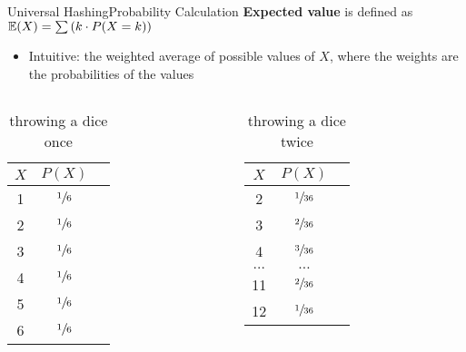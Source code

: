 \begin{frame}{Universal Hashing}{Probability Calculation}
  \textbf{Expected value} is defined as  {\color{MainA}$\mathbb{E}(X)  = \sum \left(k \cdot P(X = k)\right)$}
  \vspace*{0em}
  \begin{itemize}
    \item <2->
      Intuitive: the weighted average of possible values of {\color{MainA}$X$}, where
      the weights are the probabilities of the values
  \end{itemize}
  \vspace*{-1.0em}
 \begin{columns}
   \begin{column}{0.5\linewidth}
     \begin{table}[!h]
       \small{
     \caption{throwing a dice once}
    \label{tab:probabilities:value_rolling_dice_once}
    \begin{tabularx}{0.25\linewidth}{c|cc}
      {\color{MainA}$X$} & {\color{MainA}$P(X)$}\\
      \midrule
      1 & $\sfrac{1}{6}$\\
      2 & $\sfrac{1}{6}$\\
      3 & $\sfrac{1}{6}$\\
      4 & $\sfrac{1}{6}$\\
      5 & $\sfrac{1}{6}$\\
      6 & $\sfrac{1}{6}$\\
    \end{tabularx}}
  \end{table}  
   \end{column}
   \begin{column}{0.5\linewidth}
     \begin{table}[!h]
       \small{
    \caption{throwing a dice twice}
    \label{tab:probabilities:value_rolling_dice_twice}
    \begin{tabularx}{0.275\linewidth}{c|cc}
      {\color{MainA}$X$ }&{\color{MainA} $P(X)$}\\
      \midrule
      2 & $\sfrac{1}{36}$\\
      3 & $\sfrac{2}{36}$\\
      4 & $\sfrac{3}{36}$\\
      $\dots$ & $\dots$\\
      11 & $\sfrac{2}{36}$\\
      12 & $\sfrac{1}{36}$\\
    \end{tabularx}}

\end{table}
\end{column}
\end{columns}
\end{frame}
